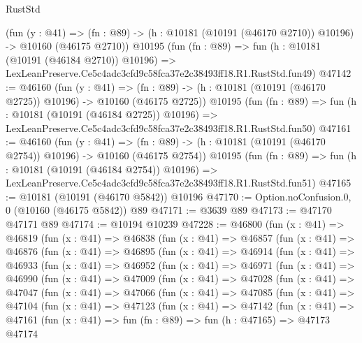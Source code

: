 \begin{lexlean}{RustStd}
\begin{coremodule}
    (fun (y : @41) =>
    (fn : @89) -> (h : @10181 (@10191 (@46170 @2710)) @10196) -> @10160 (@46175 @2710))
    @10195
    (fun (fn : @89) =>
    fun (h : @10181 (@10191 (@46184 @2710)) @10196) =>
    LexLeanPreserve.Ce5c4adc3cfd9c58fca37e2c38493ff18.R1.RustStd.fun49)
@47142 := @46160
    (fun (y : @41) =>
    (fn : @89) -> (h : @10181 (@10191 (@46170 @2725)) @10196) -> @10160 (@46175 @2725))
    @10195
    (fun (fn : @89) =>
    fun (h : @10181 (@10191 (@46184 @2725)) @10196) =>
    LexLeanPreserve.Ce5c4adc3cfd9c58fca37e2c38493ff18.R1.RustStd.fun50)
@47161 := @46160
    (fun (y : @41) =>
    (fn : @89) -> (h : @10181 (@10191 (@46170 @2754)) @10196) -> @10160 (@46175 @2754))
    @10195
    (fun (fn : @89) =>
    fun (h : @10181 (@10191 (@46184 @2754)) @10196) =>
    LexLeanPreserve.Ce5c4adc3cfd9c58fca37e2c38493ff18.R1.RustStd.fun51)
@47165 := @10181 (@10191 (@46170 @5842)) @10196
@47170 := Option.noConfusion.{0, 0} (@10160 (@46175 @5842)) @89
@47171 := @3639 @89
@47173 := @47170 @47171 @89
@47174 := @10194 @10239
@47228 := @46800
    (fun (x : @41) =>
    @46819
      (fun (x : @41) =>
      @46838
        (fun (x : @41) =>
        @46857
          (fun (x : @41) =>
          @46876
            (fun (x : @41) =>
            @46895
              (fun (x : @41) =>
              @46914
                (fun (x : @41) =>
                @46933
                  (fun (x : @41) =>
                  @46952
                    (fun (x : @41) =>
                    @46971
                      (fun (x : @41) =>
                      @46990
                        (fun (x : @41) =>
                        @47009
                          (fun (x : @41) =>
                          @47028
                            (fun (x : @41) =>
                            @47047
                              (fun (x : @41) =>
                              @47066
                                (fun (x : @41) =>
                                @47085
                                  (fun (x : @41) =>
                                  @47104
                                    (fun (x : @41) =>
                                    @47123
                                      (fun (x : @41) =>
                                      @47142
                                        (fun (x : @41) =>
                                        @47161
                                          (fun (x : @41) =>
                                          fun (fn : @89) =>
                                          fun (h : @47165) =>
                                          @47173
                                            @47174

\end{coremodule}
\end{lexlean}
